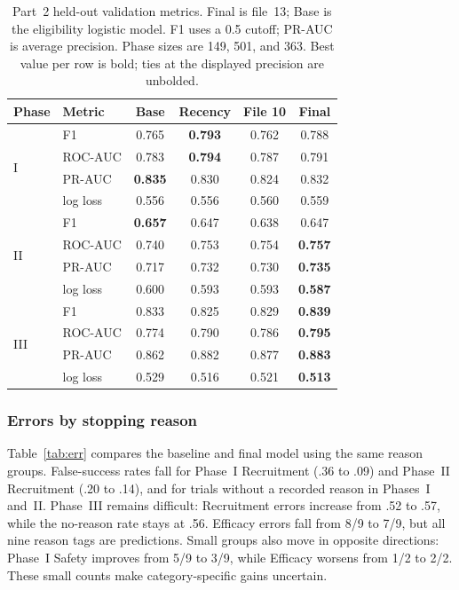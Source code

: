 \documentclass[10pt,twocolumn,letterpaper]{article}
\begin{document}
\begin{table}[t]
\centering\small
\setlength{\tabcolsep}{2pt}
\begin{tabular}{llcccc}
\toprule
Phase & Metric & Base & Recency & File 10 & Final \\
\midrule
\multirow{4}{*}{I}
 & F1 & 0.765 & \textbf{0.793} & 0.762 & 0.788 \\
 & ROC-AUC & 0.783 & \textbf{0.794} & 0.787 & 0.791 \\
 & PR-AUC & \textbf{0.835} & 0.830 & 0.824 & 0.832 \\
 & log loss & 0.556 & 0.556 & 0.560 & 0.559 \\
\midrule
\multirow{4}{*}{II}
 & F1 & \textbf{0.657} & 0.647 & 0.638 & 0.647 \\
 & ROC-AUC & 0.740 & 0.753 & 0.754 & \textbf{0.757} \\
 & PR-AUC & 0.717 & 0.732 & 0.730 & \textbf{0.735} \\
 & log loss & 0.600 & 0.593 & 0.593 & \textbf{0.587} \\
\midrule
\multirow{4}{*}{III}
 & F1 & 0.833 & 0.825 & 0.829 & \textbf{0.839} \\
 & ROC-AUC & 0.774 & 0.790 & 0.786 & \textbf{0.795} \\
 & PR-AUC & 0.862 & 0.882 & 0.877 & \textbf{0.883} \\
 & log loss & 0.529 & 0.516 & 0.521 & \textbf{0.513} \\
\bottomrule
\end{tabular}
\caption{Part~2 held-out validation metrics. Final is file~13; Base is the
eligibility logistic model. F1 uses a 0.5 cutoff; PR-AUC is average precision.
Phase sizes are 149, 501, and 363. Best value per row is bold; ties at the
displayed precision are unbolded.}
\label{tab:phase}
\end{table}

\subsubsection{Errors by stopping reason}

Table~\ref{tab:err} compares the baseline and final model using the same reason
groups. False-success rates fall for Phase~I Recruitment (.36 to .09) and
Phase~II Recruitment (.20 to .14), and for trials without a recorded reason in
Phases~I and~II. Phase~III remains difficult: Recruitment errors increase from
.52 to .57, while the no-reason rate stays at .56. Efficacy errors fall from
8/9 to 7/9, but all nine reason tags are predictions. Small groups also move
in opposite directions: Phase~I Safety improves from 5/9 to 3/9, while Efficacy
worsens from 1/2 to 2/2. These small counts make category-specific gains
uncertain.
\end{document}
